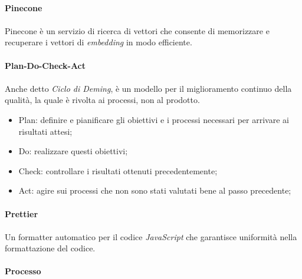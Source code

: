 \documentclass[10pt, a4paper]{article}
\begin{document}
\vspace{2em}
\paragraph{Pinecone}\noindent\hrulefill
\paragraph{}Pinecone è un servizio di ricerca di vettori che consente di memorizzare e recuperare i vettori di \textit{embedding} in modo efficiente.


\vspace{2em}
\paragraph{Plan-Do-Check-Act}\noindent\hrulefill
\paragraph{}Anche detto \textit{Ciclo di Deming}, è un modello per il
miglioramento continuo della qualità, la quale è rivolta ai processi, non al prodotto.
\begin{itemize}
    \item Plan: definire e pianificare gli obiettivi e i processi necessari per arrivare ai risultati attesi;
    \item Do: realizzare questi obiettivi;
    \item Check: controllare i risultati ottenuti precedentemente;
    \item Act: agire sui processi che non sono stati valutati bene al passo precedente;
\end{itemize}



\vspace{2em}
\paragraph{Prettier}\noindent\hrulefill
\paragraph{}Un formatter automatico per il codice \textit{JavaScript\pg} che garantisce uniformità nella formattazione del codice.


\vspace{2em}
\paragraph{Processo}\noindent\hrulefill
\end{document}
